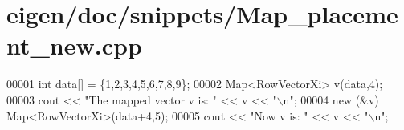 \hypertarget{eigen_2doc_2snippets_2_map__placement__new_8cpp_source}{}\section{eigen/doc/snippets/\+Map\+\_\+placement\+\_\+new.cpp}
\label{eigen_2doc_2snippets_2_map__placement__new_8cpp_source}

\begin{DoxyCode}
00001 \textcolor{keywordtype}{int} data[] = \{1,2,3,4,5,6,7,8,9\};
00002 Map<RowVectorXi> v(data,4);
00003 cout << \textcolor{stringliteral}{"The mapped vector v is: "} << v << \textcolor{stringliteral}{"\(\backslash\)n"};
00004 \textcolor{keyword}{new} (&v) Map<RowVectorXi>(data+4,5);
00005 cout << \textcolor{stringliteral}{"Now v is: "} << v << \textcolor{stringliteral}{"\(\backslash\)n"};
\end{DoxyCode}
